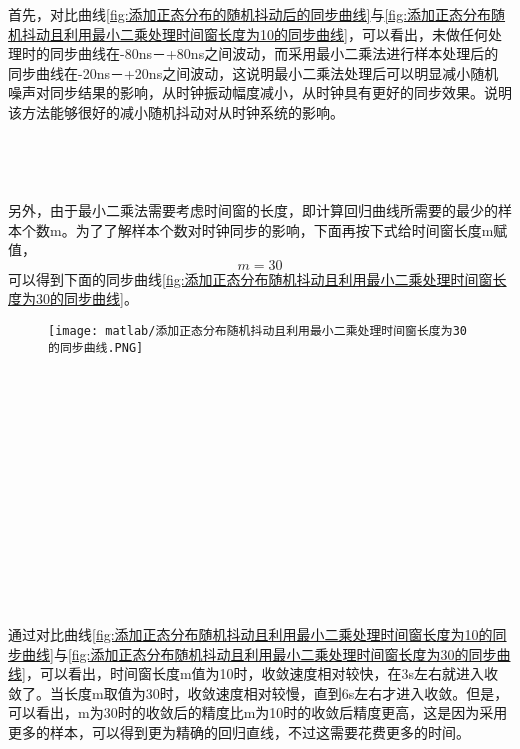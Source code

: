 首先，对比曲线\ref{fig:添加正态分布的随机抖动后的同步曲线}与\ref{fig:添加正态分布随机抖动且利用最小二乘处理时间窗长度为10的同步曲线}，可以看出，未做任何处理时的同步曲线在-80ns－+80ns之间波动，而采用最小二乘法进行样本处理后的同步曲线在-20ns－+20ns之间波动，这说明最小二乘法处理后可以明显减小随机噪声对同步结果的影响，从时钟振动幅度减小，从时钟具有更好的同步效果。说明该方法能够很好的减小随机抖动对从时钟系统的影响。
\\ \\ \\ \\ \\
另外，由于最小二乘法需要考虑时间窗的长度，即计算回归曲线所需要的最少的样本个数m。为了了解样本个数对时钟同步的影响，下面再按下式给时间窗长度m赋值，
\begin{equation}
  m = 30
\end{equation}
可以得到下面的同步曲线\ref{fig:添加正态分布随机抖动且利用最小二乘处理时间窗长度为30的同步曲线}。
\begin{figure}[htbp]
  \centering
  \begin{minipage}[b]{1\textwidth}
    \captionstyle{\centering}
    \centering
    \texttt{[image: matlab/添加正态分布随机抖动且利用最小二乘处理时间窗长度为30的同步曲线.PNG]}
  \end{minipage}     
\end{figure}
\\ \\ \\ \\ \\ \\ \\ \\ \\ \\ \\ \\ \\
通过对比曲线\ref{fig:添加正态分布随机抖动且利用最小二乘处理时间窗长度为10的同步曲线}与\ref{fig:添加正态分布随机抖动且利用最小二乘处理时间窗长度为30的同步曲线}，可以看出，时间窗长度m值为10时，收敛速度相对较快，在3s左右就进入收敛了。当长度m取值为30时，收敛速度相对较慢，直到6s左右才进入收敛。但是，可以看出，m为30时的收敛后的精度比m为10时的收敛后精度更高，这是因为采用更多的样本，可以得到更为精确的回归直线，不过这需要花费更多的时间。

